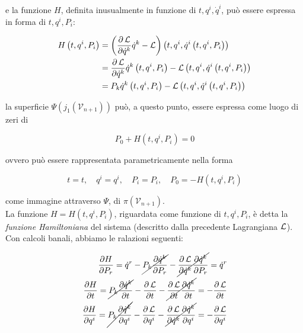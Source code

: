 e la funzione $ H $, definita inusualmente in funzione di $ t, q^i, \dot{q}^i $, può essere espressa in forma di $ t, q^i, P_i $:


\begin{equation*}
\begin{split}
H \left( t, q^i, P_i \right) &= \left( \frac{\partial \operatorname{\mathcal{L}}}{\partial \dot{q}^k} \dot{q}^k - \operatorname{\mathcal{L}} \right) \left( t, q^i, \dot{q}^i\left( t, q^i, P_i \right) \right) \\
&= \frac{\partial \operatorname{\mathcal{L}}}{\partial \dot{q}^k} \dot{q}^k \left( t, q^i, P_i \right) - \operatorname{\mathcal{L}} \left( t, q^i, \dot{q}^i\left( t, q^i, P_i \right) \right) \\
&= P_k \dot{q}^k \left( t, q^i, P_i \right) - \operatorname{\mathcal{L}} \left( t, q^i, \dot{q}^i \left( t, q^i, P_i \right) \right)
\end{split}
\end{equation*}

la superficie $ \Psi \left( j_1 (\mathcal{V}_{n + 1}) \right) $ può, a questo punto, essere espressa come luogo di zeri di

\begin{equation*}
P_0 + H \left( t, q^i, P_i \right) = 0
\end{equation*}

ovvero può essere rappresentata parametricamente nella forma

\begin{equation*}
t = t, \quad q^i = q^i, \quad P_i = P_i, \quad P_0 = - H \left( t, q^i, P_i \right)
\end{equation*}

come immagine attraverso $ \Psi $, di $ \pi(\mathcal{V}_{n + 1}) $.\\

La funzione $ H = H \left( t, q^i, P_i \right) $, riguardata come funzione di $ t, q^i, P_i $, è detta la \textit{funzione Hamiltoniana} del sistema (descritto dalla precedente Lagrangiana $ \operatorname{\mathcal{L}} $). \\

Con calcoli banali, abbiamo le ralazioni seguenti:

\begin{equation*}
\begin{split}
\frac{\partial H}{\partial P_r} = \dot{q}^r - \cancel{P_k \frac{\partial \dot{q}^k}{\partial P_r}} - \cancel{\frac{\partial \operatorname{\mathcal{L}}}{\partial \dot{q}^k} \frac{\partial \dot{q}^k}{\partial P_r}} = \dot{q}^r \\
\frac{\partial H}{\partial t} = \cancel{P_k \frac{\partial \dot{q}^k}{\partial t}} - \frac{\partial \operatorname{\mathcal{L}}}{\partial t} - \cancel{\frac{\partial \operatorname{\mathcal{L}}}{\partial t} \frac{\partial \dot{q}^k}{\partial t}} = - \frac{\partial \operatorname{\mathcal{L}}}{\partial t} \\
\frac{\partial H}{\partial q^i} = \cancel{P_k \frac{\partial \dot{q}^k}{\partial q^i}} - \frac{\partial \operatorname{\mathcal{L}}}{\partial q^i} - \cancel{\frac{\partial \operatorname{\mathcal{L}}}{\partial \dot{q}^k} \frac{\partial \dot{q}^k}{\partial q^i}} = - \frac{\partial \operatorname{\mathcal{L}}}{\partial q^i}
\end{split}
\end{equation*}

